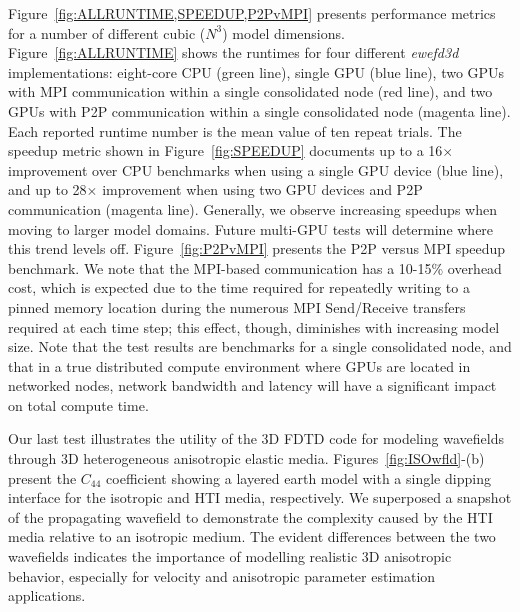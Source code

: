 
Figure~\ref{fig:ALLRUNTIME,SPEEDUP,P2PvMPI} presents performance metrics for a number of different cubic ($N^3$) model dimensions.  Figure~\ref{fig:ALLRUNTIME} shows the runtimes for four different {\it ewefd3d} implementations: eight-core CPU (green line), single GPU (blue line), two GPUs with MPI communication within a single consolidated node (red line), and two GPUs with P2P communication within a single consolidated node (magenta line).  Each reported runtime number is the mean value of ten repeat trials.  The speedup metric shown in Figure~\ref{fig:SPEEDUP} documents up to a 16$\times$ improvement over CPU benchmarks when using a single GPU device (blue line), and up to 28$\times$ improvement when using two GPU devices and P2P communication (magenta line).  Generally, we observe increasing speedups when moving to larger model domains.  Future multi-GPU tests will determine where this trend levels off.  Figure~\ref{fig:P2PvMPI} presents the P2P versus MPI speedup benchmark.  We note that the MPI-based communication has a 10-15\% overhead cost, which is expected due to the time required for repeatedly writing to a pinned memory location during the numerous MPI Send/Receive transfers required at each time step; this effect, though, diminishes with increasing model size.  Note that the test results are benchmarks for a single consolidated node, and that in a true distributed compute environment where GPUs are located in networked nodes, network bandwidth and latency will have a significant impact on total compute time.



Our last test illustrates the utility of the 3D FDTD  code for modeling wavefields through 3D heterogeneous anisotropic elastic media.  Figures~\ref{fig:ISOwfld}-(b) present the $C_{44}$ coefficient showing a layered earth model with a single dipping interface for the isotropic and HTI media, respectively.  We superposed a snapshot of the propagating wavefield to demonstrate the complexity caused by the HTI media relative to an isotropic medium.  The evident differences between the two wavefields indicates the importance of modelling realistic 3D anisotropic behavior, especially for velocity and anisotropic parameter estimation applications.

